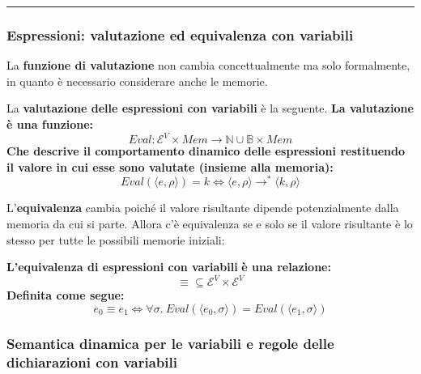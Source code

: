 \documentclass[a4paper]{article}
\newcommand{\longline}{\noindent\rule{\textwidth}{0.4pt}}
\begin{document}
 	\longline
 	
 	\subsubsection{Espressioni: valutazione ed equivalenza con variabili}
 	
 	La \textbf{funzione di valutazione} non cambia concettualmente ma solo formalmente, in quanto è necessario considerare anche le memorie.
 	
 	\begin{boxdef}
 		La \textcolor{Red3}{\textbf{valutazione delle espressioni con variabili}} è la seguente. \textbf{La valutazione è una funzione:}
 		\begin{equation*}
 			Eval: \mathcal{E}^{V} \times Mem \longrightarrow \mathbb{N} \cup \mathbb{B} \times Mem
 		\end{equation*}
 		\textbf{Che descrive il comportamento dinamico delle espressioni restituendo il valore in cui esse sono valutate (insieme alla memoria):}
 		\begin{equation*}
 			Eval\left(\langle e, \rho \rangle\right) = k \iff \langle e,\rho \rangle \longrightarrow^{*} \langle k,\rho \rangle
 		\end{equation*}
 	\end{boxdef}\:\newline
 
 	\noindent
 	L'\textbf{equivalenza} cambia poiché il valore risultante dipende potenzialmente dalla memoria da cui si parte. Allora c'è equivalenza se e solo se il valore risultante è lo stesso per tutte le possibili memorie iniziali:
 	
 	\begin{boxdef}
 		\textbf{L'}\textcolor{Red3}{\textbf{equivalenza di espressioni con variabili}} \textbf{è una relazione:}
 		\begin{equation*}
 			\equiv \subseteq \mathcal{E}^{V} \times \mathcal{E}^{V}
 		\end{equation*}
 		\textbf{Definita come segue:}
 		\begin{equation*}
 			e_{0} \equiv e_{1} \iff \forall \sigma. \: Eval\left(\langle e_{0},\sigma \rangle\right) = Eval\left( \langle e_{1},\sigma \rangle \right)
 		\end{equation*}
 	\end{boxdef}\newpage
 	
 	\subsubsection{Semantica dinamica per le variabili e regole delle dichiarazioni con variabili}
 	
\end{document}
